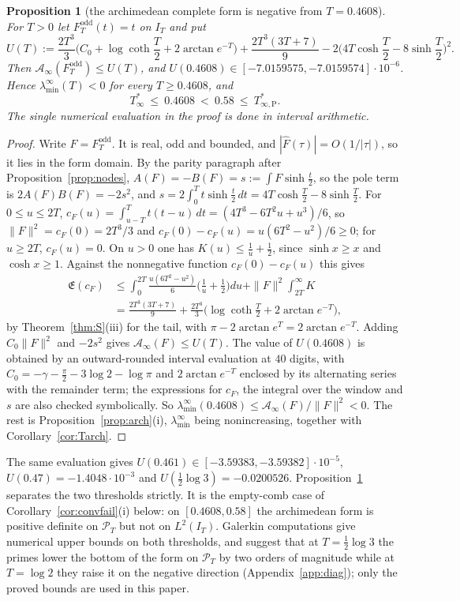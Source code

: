 \documentclass[11pt]{amsart}
\newtheorem{proposition}[theorem]{Proposition}
\theoremstyle{definition}
\theoremstyle{remark}
\newcommand{\PT}{\mathcal P_T}
\newcommand{\IT}{I_T}
\newcommand{\Fh}{\widehat F}
\newcommand{\cF}{c_F}
\newcommand{\Lev}{\mathfrak E}
\newcommand{\Ainf}{\mathcal A_\infty}
\newcommand{\laminf}{\lambda^{\infty}_{\min}}
\begin{document}
\begin{proposition}[the archimedean complete form is negative from $T=0.4608$]\label{prop:archneg}
For $T>0$ let $F^{\mathrm{odd}}_T(t)=t$ on $\IT$ and put
\[
U(T):=\frac{2T^3}3\Big(C_0+\log\coth\frac T2+2\arctan e^{-T}\Big)+\frac{2T^3(3T+7)}9
-2\Big(4T\cosh\frac T2-8\sinh\frac T2\Big)^2 .
\]
Then $\Ainf(F^{\mathrm{odd}}_T)\le U(T)$, and $U(0.4608)\in[-7.0159575,-7.0159574]\cdot10^{-6}$. Hence
$\laminf(T)<0$ for every $T\ge0.4608$, and
\[
T^*_\infty\ \le\ 0.4608\ <\ 0.58\ \le\ T^*_{\infty,\mathrm P} .
\]
The single numerical evaluation in the proof is done in interval arithmetic.
\end{proposition}
\begin{proof}
Write $F=F^{\mathrm{odd}}_T$. It is real, odd and bounded, and $|\Fh(\tau)|=O(1/|\tau|)$, so it lies in the
form domain. By the parity paragraph after Proposition~\ref{prop:nodes}, $A(F)=-B(F)=s:=\int F\sinh\frac t2$,
so the pole term is $2A(F)B(F)=-2s^2$, and $s=2\int_0^Tt\sinh\frac t2\,dt=4T\cosh\frac T2-8\sinh\frac T2$.
For $0\le u\le2T$, $\cF(u)=\int_{u-T}^Tt(t-u)\,dt=(4T^3-6T^2u+u^3)/6$, so $\|F\|^2=\cF(0)=2T^3/3$ and
$\cF(0)-\cF(u)=u(6T^2-u^2)/6\ge0$; for $u\ge2T$, $\cF(u)=0$. On $u>0$ one has $K(u)\le\frac1u+\frac12$,
since $\sinh x\ge x$ and $\cosh x\ge1$. Against the nonnegative function $\cF(0)-\cF(u)$ this gives
\begin{align*}
\Lev(\cF)&\le\int_0^{2T}\frac{u(6T^2-u^2)}6\Big(\frac1u+\frac12\Big)du+\|F\|^2\int_{2T}^\infty K\\
&=\frac{2T^3(3T+7)}9+\frac{2T^3}3\Big(\log\coth\frac T2+2\arctan e^{-T}\Big),
\end{align*}
by Theorem~\ref{thm:S}(iii) for the tail, with $\pi-2\arctan e^T=2\arctan e^{-T}$.
Adding $C_0\|F\|^2$ and $-2s^2$ gives $\Ainf(F)\le U(T)$. The value of $U(0.4608)$ is obtained by an
outward-rounded interval evaluation at $40$ digits, with $C_0=-\gamma-\frac\pi2-3\log2-\log\pi$ and
$2\arctan e^{-T}$ enclosed by its alternating series with the remainder term; the expressions for
$\cF$, the integral over the window and $s$ are also checked symbolically. So
$\laminf(0.4608)\le\Ainf(F)/\|F\|^2<0$. The rest is Proposition~\ref{prop:arch}(i), $\laminf$ being
nonincreasing, together with Corollary~\ref{cor:Tarch}.
\end{proof}
The same evaluation gives $U(0.461)\in[-3.59383,-3.59382]\cdot10^{-5}$, $U(0.47)=-1.4048\cdot10^{-3}$
and $U(\frac12\log3)=-0.0200526$. Proposition~\ref{prop:archneg} separates the two thresholds
strictly. It is the empty-comb case of Corollary~\ref{cor:convfail}(i) below: on $[0.4608,0.58]$ the
archimedean form is positive definite on $\PT$ but not on $L^2(\IT)$. Galerkin computations give
numerical upper bounds on both thresholds, and suggest that at $T=\frac12\log3$ the primes lower the
bottom of the form on $\PT$ by two orders of magnitude while at $T=\log2$ they raise it on the
negative direction (Appendix~\ref{app:diag}); only the proved bounds are used in this paper.
\end{document}
